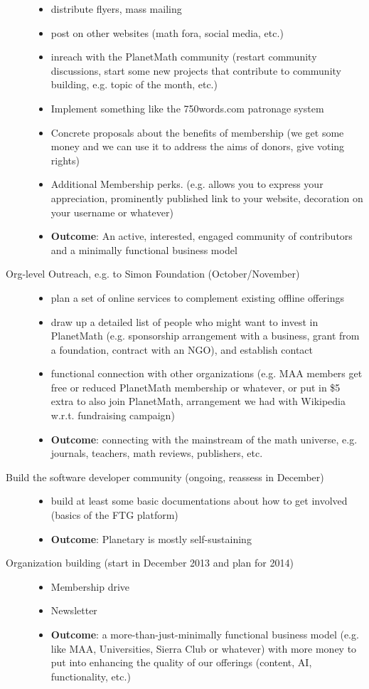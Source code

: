 \begin{description}
\begin{itemize}
\item distribute flyers, mass mailing
\item post on other websites (math fora, social media, etc.)
\item inreach with the PlanetMath community (restart community discussions, start some new projects that contribute to community building, e.g. topic of the month, etc.)
\item Implement something like the 750words.com patronage system
\item Concrete proposals about the benefits of membership (we get some money and we can use it to address the aims of donors, give voting rights)
\item Additional Membership perks. (e.g.  allows you to express your appreciation, prominently published link to  your website, decoration on your username or whatever)
\item {\bf Outcome}: An active, interested, engaged community of contributors and a minimally functional business model
\end{itemize}
%
\item[Org-level Outreach, e.g. to Simon Foundation (October/November)] \quad
\begin{itemize}
\item plan a set of online services to complement existing offline offerings
\item draw up a detailed list of people who might want to invest in PlanetMath (e.g. sponsorship arrangement with a business, grant from a foundation, contract with an NGO), and establish contact
\item functional connection with other organizations (e.g. MAA members get free or reduced PlanetMath membership or whatever, or put in \$5 extra to also join PlanetMath, arrangement we had with Wikipedia w.r.t. fundraising campaign)
\item {\bf Outcome}: connecting with the mainstream of the math universe, e.g. journals, teachers, math reviews, publishers, etc.
\end{itemize}
%
\item[Build the software developer community (ongoing, reassess in December)] \quad 
\begin{itemize}
\item build at least some basic documentations about how to get involved (basics of the FTG platform)
\item {\bf Outcome}: Planetary is mostly self-sustaining
\end{itemize}
%
\item[Organization building (start in December 2013 and plan for 2014)] \quad 
\begin{itemize}
\item Membership drive
\item Newsletter
\item {\bf Outcome}: a more-than-just-minimally functional business model (e.g. like MAA, Universities, Sierra Club or whatever) with more money to put into enhancing the quality of our offerings (content, AI, functionality, etc.)
\end{itemize}
\end{description}
